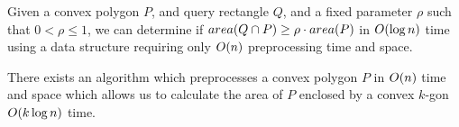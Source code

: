 \begin{corollary}
\label{cor:convexp:mp}
Given a convex polygon $P$, and query rectangle $Q$, and a fixed parameter $\rho$ such that $0 < \rho \leq 1$, we can determine if $area(Q \cap P) \geq \rho \cdot area(P)$ in $O\!\left(\log{n}\right)$ time using a data structure requiring only $O\!\left(n\right)$ preprocessing time and space.
\end{corollary}

\begin{theorem}
\label{th:convexp:karea}
There exists an algorithm which preprocesses a convex polygon $P$ in $O\!\left(n\right)$ time and space which allows us to calculate the area of $P$ enclosed by a convex $k$-gon $O\!\left(k \log{n}\right)$ time.
\end{theorem}
